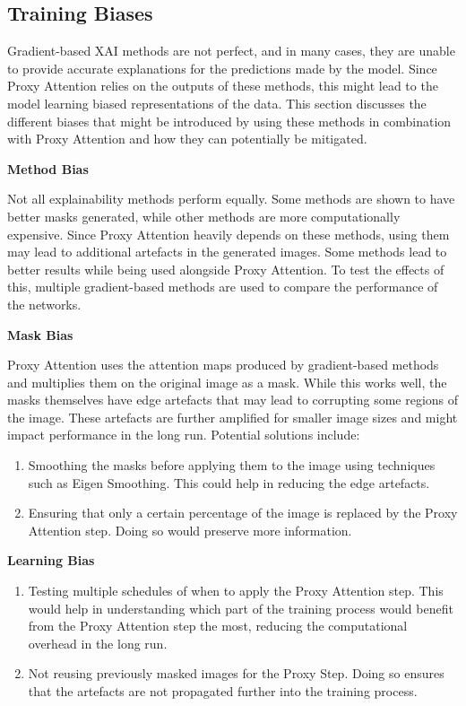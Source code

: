 \documentclass[a4paper,11pt,openright]{book}
\begin{document}
\subsection{Training Biases}
Gradient-based XAI methods are not perfect, and in many cases, they are unable to provide accurate explanations for the predictions made by the model. Since Proxy Attention relies on the outputs of these methods, this might lead to the model learning biased representations of the data. This section discusses the different biases that might be introduced by using these methods in combination with Proxy Attention and how they can potentially be mitigated.

\textbf{Method Bias}

Not all explainability methods perform equally. Some methods are shown to have better masks generated, while other methods are more computationally expensive. Since Proxy Attention heavily depends on these methods, using them may lead to additional artefacts in the generated images. Some methods lead to better results while being used alongside Proxy Attention. To test the effects of this, multiple gradient-based methods are used to compare the performance of the networks.

\textbf{Mask Bias}

Proxy Attention uses the attention maps produced by gradient-based methods and multiplies them on the original image as a mask. While this works well, the masks themselves have edge artefacts that may lead to corrupting some regions of the image. These artefacts are further amplified for smaller image sizes and might impact performance in the long run.
Potential solutions include:

\begin{enumerate}
    \item Smoothing the masks before applying them to the image using techniques such as Eigen Smoothing. This could help in reducing the edge artefacts.
    \item Ensuring that only a certain percentage of the image is replaced by the Proxy Attention step. Doing so would preserve more information.
\end{enumerate}

\textbf{Learning Bias}
\begin{enumerate}
    \item Testing multiple schedules of when to apply the Proxy Attention step. This would help in understanding which part of the training process would benefit from the Proxy Attention step the most, reducing the computational overhead in the long run.
    \item Not reusing previously masked images for the Proxy Step. Doing so ensures that the artefacts are not propagated further into the training process.
\end{enumerate}
\end{document}
